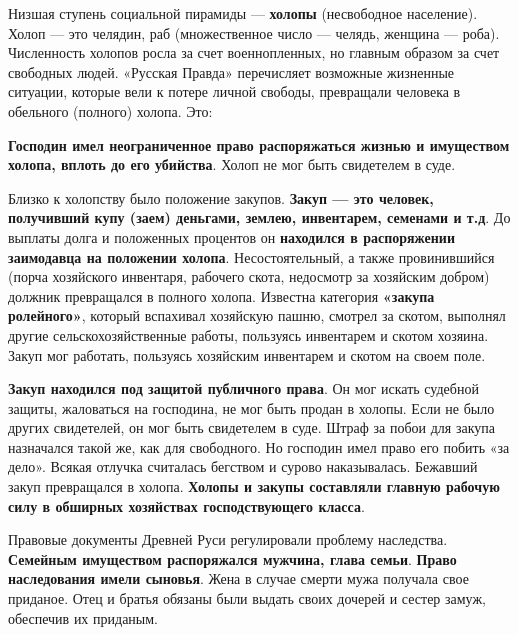\documentclass{article}
\begin{document}
Низшая ступень социальной пирамиды — \textbf{холопы} (несвободное население). Холоп — это челядин, раб (множественное число — челядь, женщина — роба). Численность холопов росла за счет военнопленных, но главным образом за счет свободных людей. «Русская Правда» перечисляет возможные жизненные ситуации, которые вели к потере личной свободы, превращали человека в обельного (полного) холопа. Это:

\begin{multienumerate}
\end{multienumerate}

\textbf{Господин имел неограниченное право распоряжаться жизнью и имуществом холопа, вплоть до его убийства}. Холоп не мог быть свидетелем в суде.

\hfill

Близко к холопству было положение закупов. \textbf{Закуп — это человек, получивший купу (заем) деньгами, землею, инвентарем, семенами и т.д}. До выплаты долга и положенных процентов он \textbf{находился в распоряжении заимодавца на положении холопа}. Несостоятельный, а также провинившийся (порча хозяйского инвентаря, рабочего скота, недосмотр за хозяйским добром) должник превращался в полного холопа. Известна категория \textbf{«закупа ролейного»}, который вспахивал хозяйскую пашню, смотрел за скотом, выполнял другие сельскохозяйственные работы, пользуясь инвентарем и скотом хозяина. Закуп мог работать, пользуясь хозяйским инвентарем и скотом на своем поле.

\textbf{Закуп находился под защитой публичного права}. Он мог искать судебной защиты, жаловаться на господина, не мог быть продан в холопы. Если не было других свидетелей, он мог быть свидетелем в суде. Штраф за побои для закупа назначался такой же, как для свободного. Но господин имел право его побить «за дело». Всякая отлучка считалась бегством и сурово наказывалась. Бежавший закуп превращался в холопа. \textbf{Холопы и закупы составляли главную рабочую силу в обширных хозяйствах господствующего класса}.

\hfill

Правовые документы Древней Руси регулировали проблему наследства. \textbf{Семейным имуществом распоряжался мужчина, глава семьи}. \textbf{Право наследования имели сыновья}. Жена в случае смерти мужа получала свое приданое. Отец и братья обязаны были выдать своих дочерей и сестер замуж, обеспечив их приданым.
\end{document}
